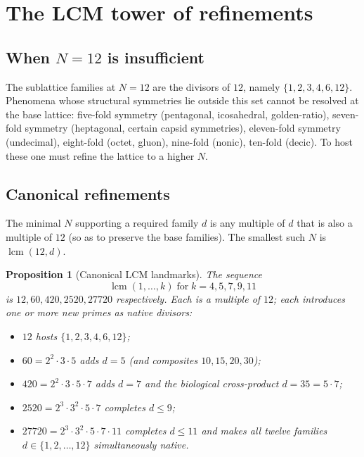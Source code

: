 \documentclass[11pt,a4paper]{article}
\newtheorem{proposition}[theorem]{Proposition}
\theoremstyle{definition}
\theoremstyle{remark}
\DeclareMathOperator{\lcm}{lcm}
\begin{document}
\section{The LCM tower of refinements}\label{sec:tower}

\subsection{When $N=12$ is insufficient}

The sublattice families at $N=12$ are the divisors of $12$, namely $\{1,2,3,4,6,12\}$. Phenomena whose structural symmetries lie outside this set cannot be resolved at the base lattice: five-fold symmetry (pentagonal, icosahedral, golden-ratio), seven-fold symmetry (heptagonal, certain capsid symmetries), eleven-fold symmetry (undecimal), eight-fold (octet, gluon), nine-fold (nonic), ten-fold (decic). To host these one must refine the lattice to a higher $N$.

\subsection{Canonical refinements}

The minimal $N$ supporting a required family $d$ is any multiple of $d$ that is also a multiple of $12$ (so as to preserve the base families). The smallest such $N$ is $\lcm(12,d)$.

\begin{proposition}[Canonical LCM landmarks]\label{prop:tower}
The sequence
\[
\lcm(1,\ldots,k) \;\text{for}\; k=4,5,7,9,11
\]
is $12,60,420,2520,27720$ respectively. Each is a multiple of $12$; each introduces one or more new primes as native divisors:
\begin{itemize}[leftmargin=*]
\item $12$ hosts $\{1,2,3,4,6,12\}$;
\item $60 = 2^{2}\cdot 3\cdot 5$ adds $d=5$ (and composites $10,15,20,30$);
\item $420 = 2^{2}\cdot 3\cdot 5\cdot 7$ adds $d=7$ and the biological cross-product $d=35=5\cdot 7$;
\item $2520 = 2^{3}\cdot 3^{2}\cdot 5\cdot 7$ completes $d\le 9$;
\item $27720 = 2^{3}\cdot 3^{2}\cdot 5\cdot 7\cdot 11$ completes $d\le 11$ and makes all twelve families $d\in\{1,2,\ldots,12\}$ simultaneously native.
\end{itemize}
\end{proposition}
\end{document}
